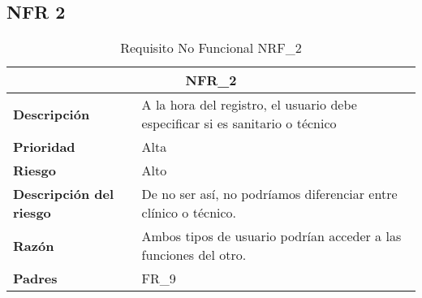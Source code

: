 \documentclass{scrreprt}
\begin{document}
\subsection{NFR 2}
    \begin{table}[H]
        \label{tab:my-table}
        \begin{tabular}{|p{5cm}|p{11cm}|}
        \hline
        \multicolumn{2}{|c|}{\textbf{NFR_2}} \\
        \hline
        \textbf{Descripción  }                      &  A la hora del registro, el usuario debe especificar si es sanitario o técnico                                                                      \\ \hline
        \textbf{Prioridad}                          & Alta                                                                                              \\ \hline
        \textbf{Riesgo}                          & Alto                                                                                                \\ \hline
        \textbf{Descripción del riesgo}                    &  De no ser así, no podríamos diferenciar entre clínico o técnico.                          \\ \hline
        \textbf{Razón}                   & Ambos tipos de usuario podrían acceder a las funciones del otro.                                                                                                                       \\ \hline
        \textbf{Padres}                               &  FR_9\\  \hline
        \end{tabular}%
        
        \caption{Requisito No Funcional NRF_2}
\end{table}
\end{document}
